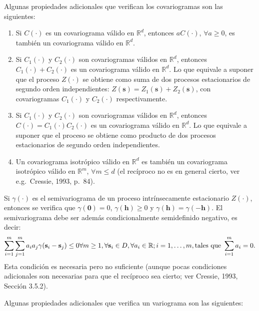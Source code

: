 \documentclass[
  spanish,
]{book}
\theoremstyle{break}
\theoremstyle{definition}
\theoremstyle{definition}
\theoremstyle{definition}
\theoremstyle{definition}
\theoremstyle{remark}
\begin{document}
Algunas propiedades adicionales que verifican los covariogramas son las siguientes:

\begin{enumerate}
\def\labelenumi{\arabic{enumi}.}
\item
  Si \(C(\cdot)\) es un covariograma válido en \(\mathbb{R}^d\), entonces \(aC(\cdot)\), \(\forall a\geq 0\), es
  también un covariograma válido en \(\mathbb{R}^d\).
\item
  Si \(C_1 (\cdot)\) y \(C_2 (\cdot)\) son covariogramas válidos en \(\mathbb{R}^d\), entonces \(C_1 (\cdot) + C_2 (\cdot)\) es un
  covariograma válido en \(\mathbb{R}^d\). Lo que equivale a suponer que el proceso \(Z(\cdot)\) se obtiene como suma de dos procesos estacionarios de segundo orden independientes: \(Z(\mathbf{s})=Z_1 (\mathbf{s}) + Z_2 (\mathbf{s})\), con covariogramas \(C_1 (\cdot)\) y \(C_2 (\cdot)\) respectivamente.
\item
  Si \(C_1 (\cdot)\) y \(C_2 (\cdot)\) son covariogramas válidos en \(\mathbb{R}^d\), entonces \(C(\cdot) = C_1 (\cdot)C_2 (\cdot)\)
  es un covariograma válido en \(\mathbb{R}^d\). Lo que equivale a suponer que el proceso se obtiene como producto de dos procesos estacionarios de segundo orden independientes.
\item
  Un covariograma isotrópico válido en \(\mathbb{R}^d\) es también un covariograma isotrópico válido en \(\mathbb{R}^m\), \(\forall m\leq d\) (el recíproco no es en general cierto, ver e.g.~Cressie, 1993, p.~84).
\end{enumerate}

Si \(\gamma (\cdot)\) es el semivariograma de un proceso intrínsecamente estacionario \(Z(\cdot)\), entonces se verifica que \(\gamma (\mathbf{0})=0\), \(\gamma (\mathbf{h})\geq 0\) y \(\gamma (\mathbf{h})=\gamma (-\mathbf{h})\).
El semivariograma debe ser además condicionalmente semidefinido negativo, es decir:
\[\sum\limits_{i=1}^{m}\sum\limits_{j=1}^{m}a_i a_j \gamma(\mathbf{s}_i -\mathbf{s}_j) \leq 0  \\
\forall m\geq 1,\forall \mathbf{s}_i \in D,\forall a_i \in \mathbb{R};i=1, \ldots,m,\text{tales que } \sum\limits_{i=1}^{m}a_i = 0.\]
Esta condición es necesaria pero no suficiente (aunque pocas condiciones adicionales son necesarias para que el recíproco sea cierto; ver Cressie, 1993, Sección 3.5.2).

Algunas propiedades adicionales que verifica un variograma son las siguientes:
\end{document}
